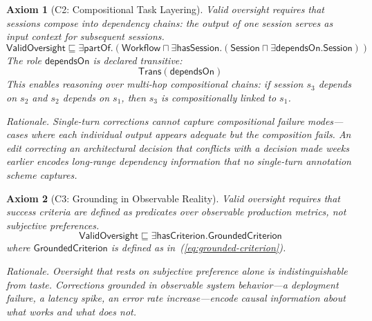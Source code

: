 \documentclass[11pt]{article}
\newtheorem{axiom}{Axiom}[section]
\newcommand{\sqsub}{\sqsubseteq}
\begin{document}
\begin{axiom}[C2: Compositional Task Layering]
\label{ax:c2}
Valid oversight requires that sessions compose into dependency chains: the output of one session serves as input context for subsequent sessions.
\begin{equation}
  \mathsf{ValidOversight} \sqsub
    \exists\mathsf{partOf}.\left(
      \mathsf{Workflow} \sqcap
      \exists\mathsf{hasSession}.\left(
        \mathsf{Session} \sqcap \exists\mathsf{dependsOn}.\mathsf{Session}
      \right)
    \right)
  \label{eq:c2}
\end{equation}
The role $\mathsf{dependsOn}$ is declared transitive:
\begin{equation}
  \mathsf{Trans}(\mathsf{dependsOn})
  \label{eq:c2-trans}
\end{equation}
This enables reasoning over multi-hop compositional chains: if session $s_3$ depends on $s_2$ and $s_2$ depends on $s_1$, then $s_3$ is compositionally linked to $s_1$.

\medskip\noindent
\emph{Rationale.}
Single-turn corrections cannot capture compositional failure modes---cases where each individual output appears adequate but the composition fails.
An edit correcting an architectural decision that conflicts with a decision made weeks earlier encodes long-range dependency information that no single-turn annotation scheme captures.
\end{axiom}

\begin{axiom}[C3: Grounding in Observable Reality]
\label{ax:c3}
Valid oversight requires that success criteria are defined as predicates over observable production metrics, not subjective preferences.
\begin{equation}
  \mathsf{ValidOversight} \sqsub
    \exists\mathsf{hasCriterion}.\mathsf{GroundedCriterion}
  \label{eq:c3}
\end{equation}
where $\mathsf{GroundedCriterion}$ is defined as in~(\ref{eq:grounded-criterion}).

\medskip\noindent
\emph{Rationale.}
Oversight that rests on subjective preference alone is indistinguishable from taste.
Corrections grounded in observable system behavior---a deployment failure, a latency spike, an error rate increase---encode causal information about what works and what does not.
\end{axiom}
\end{document}
